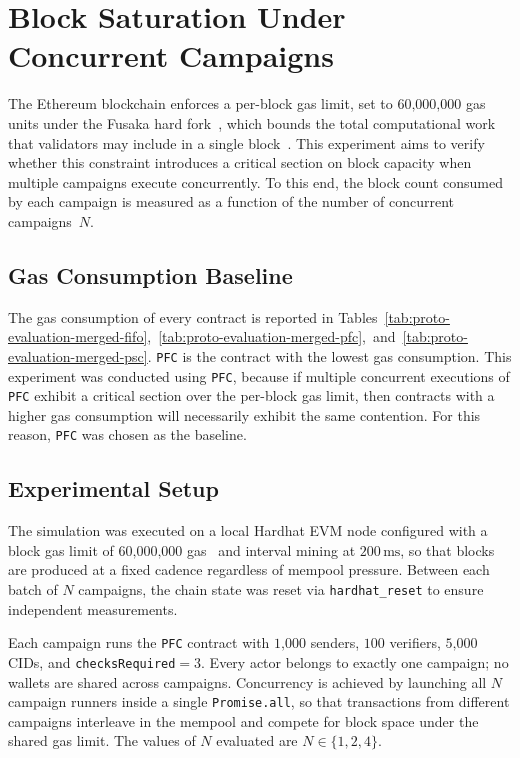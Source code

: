 \section{Block Saturation Under Concurrent Campaigns}\label{sec:proto-evaluation-concurrent-execution}
The Ethereum blockchain enforces a per-block gas limit, set to $60\text{,}000\text{,}000$
gas units under the Fusaka hard fork~\cite{eip7935}, which bounds the total computational
work that validators may include in a single block~\cite{wood2014ethereum}.
This experiment aims to verify whether this constraint introduces a critical section on
block capacity when multiple campaigns execute concurrently.
To this end, the block count consumed by each campaign is measured as a function of the number of concurrent campaigns~$N$.

\subsection{Gas Consumption Baseline}\label{subsec:proto-evaluation-concurrent-execution-baseline}
The gas consumption of every contract is reported in
Tables~\ref{tab:proto-evaluation-merged-fifo},~\ref{tab:proto-evaluation-merged-pfc},~and~\ref{tab:proto-evaluation-merged-psc}.
\texttt{PFC} is the contract with the lowest gas consumption.
This experiment was conducted using \texttt{PFC}, because if multiple concurrent
executions of \texttt{PFC} exhibit a critical section over the per-block gas limit,
then contracts with a higher gas consumption will necessarily exhibit the same contention.
For this reason, \texttt{PFC} was chosen as the baseline.

\subsection{Experimental Setup}\label{subsec:proto-evaluation-concurrent-execution-setup}
The simulation was executed on a local Hardhat EVM node configured with a block
gas limit of $60\text{,}000\text{,}000$ gas~\cite{eip7935} and interval mining
at $200\,\text{ms}$, so that blocks are produced at a fixed cadence regardless
of mempool pressure.
Between each batch of $N$ campaigns, the chain state was
reset via \texttt{hardhat\_reset} to ensure independent measurements.

Each campaign runs the \texttt{PFC} contract with $1\text{,}000$ senders,
$100$ verifiers, $5\text{,}000$ CIDs, and \texttt{checksRequired}$= 3$.
Every actor belongs to exactly one campaign; no wallets are shared across
campaigns.
Concurrency is achieved by launching all $N$ campaign runners
inside a single \texttt{Promise.all}, so that transactions from different
campaigns interleave in the mempool and compete for block space under the
shared gas limit.
The values of $N$ evaluated are $N \in \{1, 2, 4\}$.

